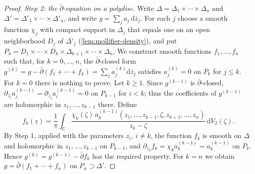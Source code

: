 \begin{proof}
\emph{Step 2: the $\bar\partial$-equation on a polydisc.} Write $\Delta=\Delta_1\times\cdots\times\Delta_n$ and $\Delta'=\Delta'_1\times\cdots\times\Delta'_n$, and write $g=\sum_ja_j\,\mathrm d\bar z_j$. For each $j$ choose a smooth function $\chi_j$ with compact support in $\Delta_j$ that equals one on an open neighborhood $D_j$ of $\overline{\Delta'_j}$ (\cref{lem:mollifier-density}), and put $P_k=D_1\times\cdots\times D_k\times\Delta_{k+1}\times\cdots\times\Delta_n$. We construct smooth functions $f_1,\ldots,f_n$ such that, for $k=0,\ldots,n$, the $\bar\partial$-closed form $g^{(k)}=g-\bar\partial(f_1+\cdots+f_k)=\sum_ja^{(k)}_j\mathrm d\bar z_j$ satisfies $a^{(k)}_j=0$ on $P_k$ for $j\leq k$. For $k=0$ there is nothing to prove. Let $k\geq1$. Since $g^{(k-1)}$ is $\bar\partial$-closed, $\partial_{\bar z_i}a^{(k-1)}_j=\partial_{\bar z_j}a^{(k-1)}_i=0$ on $P_{k-1}$ for $i<k$; thus the coefficients of $g^{(k-1)}$ are holomorphic in $z_1,\ldots,z_{k-1}$ there. Define
\[
 f_k(z)=\frac1\pi\int_{\mathbb C}\frac{\chi_k(\zeta)\,a^{(k-1)}_k(z_1,\ldots,z_{k-1},\zeta,z_{k+1},\ldots,z_n)}{z_k-\zeta}\,\mathrm dV_2(\zeta).
\]
By Step 1, applied with the parameters $z_i$, $i\neq k$, the function $f_k$ is smooth on $\Delta$ and holomorphic in $z_1,\ldots,z_{k-1}$ on $P_{k-1}$, and $\partial_{\bar z_k}f_k=\chi_ka^{(k-1)}_k=a^{(k-1)}_k$ on $P_k$. Hence $g^{(k)}=g^{(k-1)}-\bar\partial f_k$ has the required property. For $k=n$ we obtain $g=\bar\partial(f_1+\cdots+f_n)$ on $P_n\supset\Delta'$.


\end{proof}
